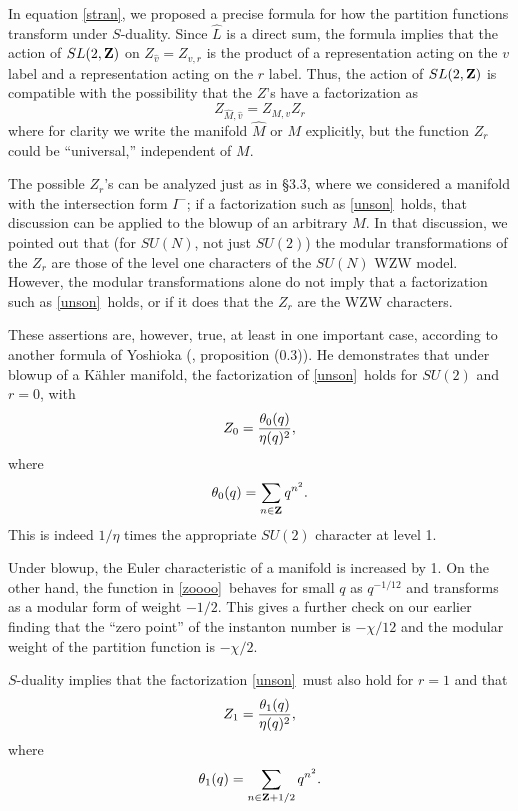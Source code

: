 \documentclass[12pt]{article}
\numberwithin{equation}{section}
\begin{document}
In equation \eqref{stran}, we proposed a precise formula for how the
partition functions transform under $S$-duality.  Since $\hat L$
is a direct sum, the formula implies that the action of $SL(2,{\bf Z})$ on
$Z_{\hat v}=Z_{v,r}$ is the product of a representation acting
on the $v$ label and a representation acting on the $r$ label.
Thus, the action of $SL(2,{\bf Z})$ is compatible with the possibility
that the $Z$'s have a factorization as
\begin{equation}
  \label{unson}
  Z_{\hat M,\hat v}=Z_{M,v}Z_r
\end{equation}
where for clarity we write the manifold $\hat M$ or $M$ explicitly, but
the function $Z_r$ could be ``universal,'' independent of $M$.

The possible $Z_r$'s can be analyzed just as in \S3.3,
where we considered a manifold with the intersection form $I^-$;
if a factorization such as \eqref{unson}\ holds, that discussion can be applied
to the blowup of an arbitrary $M$.
In that discussion, we pointed
out that (for $SU(N)$, not just $SU(2)$) the modular transformations
of the $Z_r$ are those of the level one characters of the $SU(N)$
WZW model.  However, the modular transformations alone do not
imply that a factorization such as \eqref{unson}\ holds, or if it does
that the $Z_r$ are the WZW characters.

These assertions are, however, true, at least in one important case,
according to another formula of Yoshioka (\cite{yosh}, proposition
(0.3)).  He demonstrates
that under blowup of a K\"ahler manifold,
the factorization of \eqref{unson}\ holds for $SU(2)$ and $r=0$, with
\begin{equation}
  \label{zoooo}
  Z_0={\theta_0(q)\over\eta(q)^2},
\end{equation}
where
\begin{equation}
  \label{xonx}
  \theta_0(q)=\sum_{n\in {\bf Z}}q^{n^2}.
\end{equation}
This is indeed $1/\eta$ times the appropriate $SU(2)$ character
at level 1.

Under blowup, the Euler characteristic of a manifold is increased
by 1.  On the other hand, the function in \eqref{zoooo}\ behaves for small
$q$ as $q^{-1/12}$ and transforms as a modular form of weight
$-1/2$.  This gives a further check on our earlier finding that
the ``zero point'' of the instanton number is $-\chi/12$ and
the modular weight of the partition function is $-\chi/2$.

$S$-duality implies that the factorization
\eqref{unson}\ must also hold for $r=1$ and that
\begin{equation}
  \label{zooom}
  Z_1={\theta_1(q)\over\eta(q)^2},
\end{equation}
where
\begin{equation}
  \label{xonxo}
  \theta_1(q)=\sum_{n\in {\bf Z}+1/2}q^{n^2}.
\end{equation}
\end{document}
